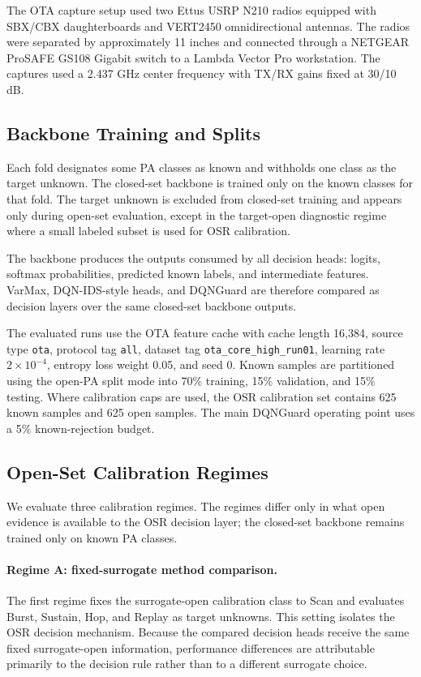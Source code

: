 The OTA capture setup used two Ettus USRP N210 radios equipped with SBX/CBX daughterboards and VERT2450 omnidirectional antennas. The radios were separated by approximately 11 inches and connected through a NETGEAR ProSAFE GS108 Gigabit switch to a Lambda Vector Pro workstation. The captures used a 2.437 GHz center frequency with TX/RX gains fixed at 30/10 dB.

\subsection{Backbone Training and Splits}
\label{subsec:backbone_training}

Each fold designates some PA classes as known and withholds one class as the target unknown. The closed-set backbone is trained only on the known classes for that fold. The target unknown is excluded from closed-set training and appears only during open-set evaluation, except in the target-open diagnostic regime where a small labeled subset is used for OSR calibration.

The backbone produces the outputs consumed by all decision heads: logits, softmax probabilities, predicted known labels, and intermediate features. VarMax, DQN-IDS-style heads, and DQNGuard are therefore compared as decision layers over the same closed-set backbone outputs.

The evaluated runs use the OTA feature cache with cache length 16,384, source type \texttt{ota}, protocol tag \texttt{all}, dataset tag \texttt{ota\_core\_high\_run01}, learning rate $2\times10^{-4}$, entropy loss weight 0.05, and seed 0. Known samples are partitioned using the open-PA split mode into 70\% training, 15\% validation, and 15\% testing. Where calibration caps are used, the OSR calibration set contains 625 known samples and 625 open samples. The main DQNGuard operating point uses a 5\% known-rejection budget.

\subsection{Open-Set Calibration Regimes}
\label{subsec:calibration_regimes}

We evaluate three calibration regimes. The regimes differ only in what open evidence is available to the OSR decision layer; the closed-set backbone remains trained only on known PA classes.

\paragraph{Regime A: fixed-surrogate method comparison.}
The first regime fixes the surrogate-open calibration class to Scan and evaluates Burst, Sustain, Hop, and Replay as target unknowns. This setting isolates the OSR decision mechanism. Because the compared decision heads receive the same fixed surrogate-open information, performance differences are attributable primarily to the decision rule rather than to a different surrogate choice.

